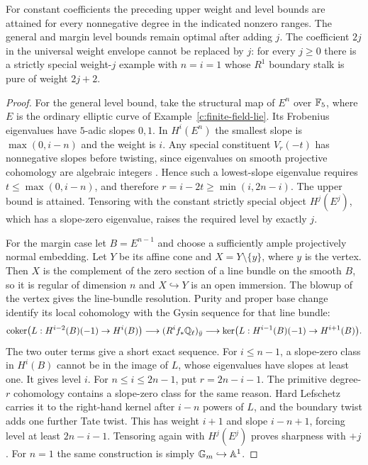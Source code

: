 \begin{proposition}
\label{c:level-optimality}
For constant coefficients the preceding upper weight and level bounds are attained for every nonnegative degree in the indicated nonzero ranges. The general and margin level bounds remain optimal after adding $j$. The coefficient $2j$ in the universal weight envelope cannot be replaced by $j$: for every $j\geq0$ there is a strictly special weight-$j$ example with $n=i=1$ whose $R^1$ boundary stalk is pure of weight $2j+2$.
\end{proposition}

\begin{proof}
For the general level bound, take the structural map of $E^n$ over $\mathbb F_5$, where $E$ is the ordinary elliptic curve of Example~\ref{c:finite-field-lie}. Its Frobenius eigenvalues have $5$-adic slopes $0,1$. In $H^i(E^n)$ the smallest slope is $\max(0,i-n)$ and the weight is $i$. Any special constituent $V_r(-t)$ has nonnegative slopes before twisting, since eigenvalues on smooth projective cohomology are algebraic integers \citep[Expos\'e XXI, Theorem~5.2.2 and Corollary~5.5.3, pp.~385--386 and 393--395]{c_katzdeligne1973niveau}. Hence such a lowest-slope eigenvalue requires $t\leq\max(0,i-n)$, and therefore $r=i-2t\geq\min(i,2n-i)$. The upper bound is attained. Tensoring with the constant strictly special object $H^j(E^j)$, which has a slope-zero eigenvalue, raises the required level by exactly $j$.

For the margin case let $B=E^{n-1}$ and choose a sufficiently ample projectively normal embedding. Let $Y$ be its affine cone and $X=Y\setminus\{y\}$, where $y$ is the vertex. Then $X$ is the complement of the zero section of a line bundle on the smooth $B$, so it is regular of dimension $n$ and $X\hookrightarrow Y$ is an open immersion. The blowup of the vertex gives the line-bundle resolution. Purity and proper base change identify its local cohomology with the Gysin sequence for that line bundle:
\[
 \operatorname{coker}\bigl(L:H^{i-2}(B)(-1)\to H^i(B)\bigr)
 \longrightarrow (R^if_*\mathbb Q_\ell)_{\bar y}
 \longrightarrow\ker\bigl(L:H^{i-1}(B)(-1)\to H^{i+1}(B)\bigr).
\]
The two outer terms give a short exact sequence. For $i\leq n-1$, a slope-zero class in $H^i(B)$ cannot be in the image of $L$, whose eigenvalues have slopes at least one. It gives level $i$. For $n\leq i\leq2n-1$, put $r=2n-i-1$. The primitive degree-$r$ cohomology contains a slope-zero class for the same reason. Hard Lefschetz carries it to the right-hand kernel after $i-n$ powers of $L$, and the boundary twist adds one further Tate twist. This has weight $i+1$ and slope $i-n+1$, forcing level at least $2n-i-1$. Tensoring again with $H^j(E^j)$ proves sharpness with $+j$. For $n=1$ the same construction is simply ${\mathbb G_m}\hookrightarrow\mathbb A^1$.


\end{proof}
